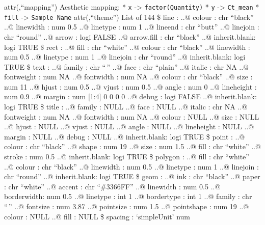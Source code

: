 \documentclass[
]{article}
\begin{document}
attr(,``mapping'') Aesthetic mapping: * \texttt{x} -\textgreater{}
\texttt{factor(Quantity)} * \texttt{y} -\textgreater{} \texttt{Ct\_mean}
* \texttt{fill} -\textgreater{} \texttt{Sample\ Name} attr(,``theme'')
List of 144 \$ line : ..@ colour : chr ``black'' ..@ linewidth : num 0.5
..@ linetype : num 1 ..@ lineend : chr ``butt'' ..@ linejoin : chr
``round'' ..@ arrow : logi FALSE ..@ arrow.fill : chr ``black'' ..@
inherit.blank: logi TRUE \$ rect : ..@ fill : chr ``white'' ..@ colour :
chr ``black'' ..@ linewidth : num 0.5 ..@ linetype : num 1 ..@ linejoin
: chr ``round'' ..@ inherit.blank: logi TRUE \$ text : ..@ family : chr
``\,'' ..@ face : chr ``plain'' ..@ italic : chr NA ..@ fontweight : num
NA ..@ fontwidth : num NA ..@ colour : chr ``black'' ..@ size : num 11
..@ hjust : num 0.5 ..@ vjust : num 0.5 ..@ angle : num 0 ..@ lineheight
: num 0.9 ..@ margin : num {[}1:4{]} 0 0 0 0 ..@ debug : logi FALSE ..@
inherit.blank: logi TRUE \$ title : ..@ family : NULL ..@ face : NULL
..@ italic : chr NA ..@ fontweight : num NA ..@ fontwidth : num NA ..@
colour : NULL ..@ size : NULL ..@ hjust : NULL ..@ vjust : NULL ..@
angle : NULL ..@ lineheight : NULL ..@ margin : NULL ..@ debug : NULL
..@ inherit.blank: logi TRUE \$ point : ..@ colour : chr ``black'' ..@
shape : num 19 ..@ size : num 1.5 ..@ fill : chr ``white'' ..@ stroke :
num 0.5 ..@ inherit.blank: logi TRUE \$ polygon : ..@ fill : chr
``white'' ..@ colour : chr ``black'' ..@ linewidth : num 0.5 ..@
linetype : num 1 ..@ linejoin : chr ``round'' ..@ inherit.blank: logi
TRUE \$ geom : ..@ ink : chr ``black'' ..@ paper : chr ``white'' ..@
accent : chr ``\#3366FF'' ..@ linewidth : num 0.5 ..@ borderwidth: num
0.5 ..@ linetype : int 1 ..@ bordertype : int 1 ..@ family : chr ``\,''
..@ fontsize : num 3.87 ..@ pointsize : num 1.5 ..@ pointshape : num 19
..@ colour : NULL ..@ fill : NULL \$ spacing : `simpleUnit' num
\end{document}
